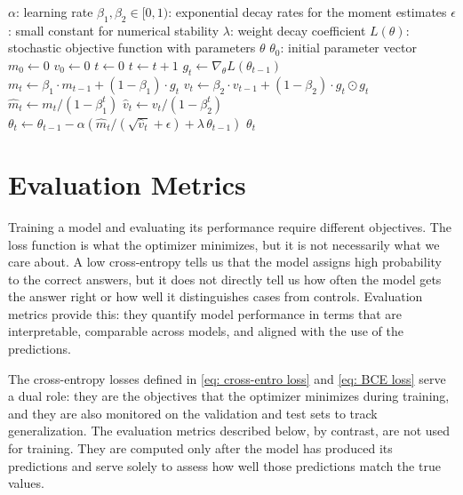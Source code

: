 \begin{algorithm}[h]
\caption{AdamW optimizer \citep{AdamW}.}
\label{alg:adamw}
\begin{algorithmic}[1]
\Require $\alpha$: learning rate
\Require $\beta_1, \beta_2 \in [0, 1)$: exponential decay rates for the moment estimates
\Require $\epsilon$: small constant for numerical stability
\Require $\lambda$: weight decay coefficient
\Require $L(\theta)$: stochastic objective function with parameters $\theta$
\Require $\theta_0$: initial parameter vector
\State $m_0 \leftarrow 0$ 
\State $v_0 \leftarrow 0$ 
\State $t \leftarrow 0$ 
    \State $t \leftarrow t + 1$
    \State $g_t \leftarrow \nabla_\theta L(\theta_{t-1})$ 
    \State $m_t \leftarrow \beta_1 \cdot m_{t-1} + (1 - \beta_1) \cdot g_t$ 
    \State $v_t \leftarrow \beta_2 \cdot v_{t-1} + (1 - \beta_2) \cdot g_t \odot g_t$ 
    \State $\hat{m}_t \leftarrow m_t / (1 - \beta_1^t)$ 
    \State $\hat{v}_t \leftarrow v_t / (1 - \beta_2^t)$ 
    \State $\theta_t \leftarrow \theta_{t-1} - \alpha \left( \hat{m}_t / (\sqrt{\hat{v}_t} + \epsilon) + \lambda\, \theta_{t-1} \right)$ 
\EndWhile
\State \Return $\theta_t$
\end{algorithmic}
\end{algorithm}

\section{Evaluation Metrics}
\label{sec:evaluation}
Training a model and evaluating its performance require different
objectives. The loss function is what the optimizer minimizes, but it is
not necessarily what we care about. A low cross-entropy tells us that the
model assigns high probability to the correct answers, but it does not
directly tell us how often the model gets the answer right or how well it
distinguishes cases from controls. Evaluation metrics provide this: they
quantify model performance in terms that are interpretable, comparable
across models, and aligned with the use of the predictions.

The cross-entropy losses defined in \eqref{eq: cross-entro loss} and
\eqref{eq: BCE loss} serve a dual role: they are the objectives that the
optimizer minimizes during training, and they are also monitored on the
validation and test sets to track generalization. The evaluation metrics
described below, by contrast, are not used for training. They are computed
only after the model has produced its predictions and serve solely to
assess how well those predictions match the true values.

